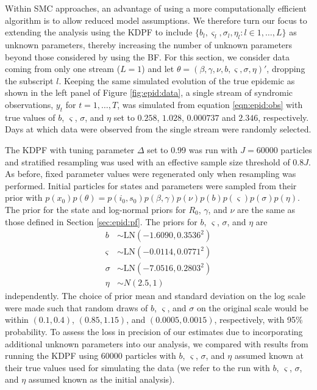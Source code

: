 Within SMC approaches, an advantage of using a more computationally efficient algorithm is to allow reduced model assumptions. We therefore turn our focus to extending the analysis using the KDPF to include $\{b_l,\varsigma_l,\sigma_l,\eta_l:l\in1,\ldots,L\}$ as unknown parameters, thereby increasing the number of unknown parameters beyond those considered by \citet{skvortsov2012monitoring} using the BF. For this section, we consider data coming from only one stream ($L = 1$) and let $\theta = (\beta, \gamma, \nu, b, \varsigma, \sigma, \eta)'$, dropping the subscript $l$. Keeping the same simulated evolution of the true epidemic as shown in the left panel of Figure \ref{fig:epid:data}, a single stream of syndromic observations, $y_t$ for $t = 1,\ldots,T$, was simulated from equation \eqref{eqn:epid:obs} with true values of $b$, $\varsigma$, $\sigma$, and $\eta$ set to $0.258$, $1.028$, $0.000737$ and $2.346$, respectively. Days at which data were observed from the single stream were randomly selected.

The KDPF with tuning parameter $\Delta$ set to 0.99 was run with $J = 60000$ particles and stratified resampling was used with an effective sample size threshold of $0.8J$. As before, fixed parameter values were regenerated only when resampling was performed. Initial particles for states and parameters were sampled from their prior with $p(x_0)p(\theta) = p(i_0, s_0)p(\beta, \gamma)p(\nu)p(b)p(\varsigma)p(\sigma)p(\eta)$. The prior for the state and log-normal priors for $R_0$, $\gamma$, and $\nu$ are the same as those defined in Section \ref{sec:epid:pf}. The priors for $b$, $\varsigma$, $\sigma$, and $\eta$ are
\begin{align}
b &\sim \mbox{LN}(-1.6090, 0.3536^2) \label{eqn:epid:ext:prior} \\
\varsigma &\sim \mbox{LN}(-0.0114, 0.0771^2) \nonumber \\
\sigma &\sim \mbox{LN}(-7.0516, 0.2803^2) \nonumber \\
\eta &\sim N(2.5, 1) \nonumber
\end{align}
independently. The choice of prior mean and standard deviation on the log scale were made such that random draws of $b$, $\varsigma$, and $\sigma$ on the original scale would be within $(0.1, 0.4)$, $(0.85, 1.15)$, and $(0.0005, 0.0015)$, respectively, with 95\% probability. To assess the loss in precision of our estimates due to incorporating additional unknown parameters into our analysis, we compared with results from running the KDPF using 60000 particles with $b$, $\varsigma$, $\sigma$, and $\eta$ assumed known at their true values used for simulating the data (we refer to the run with $b$, $\varsigma$, $\sigma$, and $\eta$ assumed known as the initial analysis).


